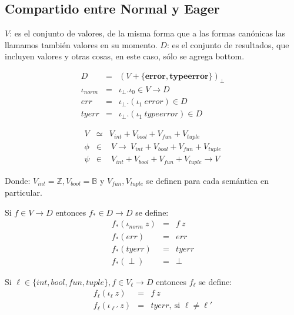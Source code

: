     \subsection{Compartido entre Normal y Eager}
      \PN $V$: es el conjunto de valores, de la misma forma que a las formas canónicas las llamamos también valores en su momento.
      \PN $D$: es el conjunto de resultados, que incluyen valores y otras cosas, en este caso, sólo se agrega bottom.

      \begin{multicols}{2}
        \begin{eqnarray*}
          D &=& (V + \{\textbf{error}, \textbf{typeerror}\})_\bot \\
          \iota_{norm} &=& \iota_{\bot} . \iota_{0} \in V \rightarrow D \\
          err &=& \iota_{\bot} . (\iota_{1} \ error) \in D \\
          tyerr &=& \iota_{\bot} . (\iota_{1} \ typeerror) \in D
        \end{eqnarray*}

        \begin{eqnarray*}
          V &\simeq& V_{int} + V_{bool} + V_{fun} + V_{tuple} \\
          \phi &\in& \ V \rightarrow\ V_{int} + V_{bool} + V_{fun} + V_{tuple} \\
          \psi &\in& \ V_{int} + V_{bool} + V_{fun} + V_{tuple} \rightarrow V
        \end{eqnarray*}
      \end{multicols}

      \PN Donde: $V_{int} = \mathbb{Z}, V_{bool} = \mathbb{B}$ y $V_{fun}, V_{tuple}$ se definen para cada semántica en particular.

      \begin{multicols}{2}
        \PN Si $f\in V\rightarrow D$ entonces $f_{*}\in D\rightarrow D$ se define:
        \begin{eqnarray*}
          f_* (\iota_{norm}\ z) &=& f\ z\\
          f_* (err) &=& err\\
          f_* (tyerr) &=& tyerr\\
          f_* (\perp) &=& \perp
        \end{eqnarray*}
        
        \PN Si $\ell \in \{int, bool, fun, tuple\}, f \in V_{\ell} \rightarrow D$ entonces $f_{\ell}$ se define:
        \begin{eqnarray*}
          f_{\ell} (\iota_{\ell}\ z) &=& f\ z\\
          f_{\ell} (\iota_{\ell'}\ z) &=& tyerr, \ \text{si } \ell \neq \ell'
        \end{eqnarray*}
      \end{multicols}

